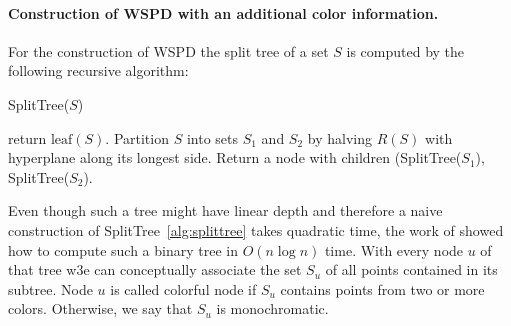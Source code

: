 \documentclass{article}
\begin{document}
\paragraph{Construction of WSPD with an additional color information.} For the construction of WSPD the split tree of a 
set $S$ is computed by the following recursive algorithm: 
\begin{algorithm}
\caption{SplitTree($S$)}\label{alg:splittree}
\begin{algorithmic}
    \State return $\textrm{leaf}(S)$.
    \Else
    \State Partition $S$ into sets $S_1$ and $S_2$ by halving $R(S)$ with hyperplane along its longest side. 
    \State Return a node with children (SplitTree($S_1$), SplitTree($S_2$).
    \EndIf
\end{algorithmic}
\end{algorithm}
Even though such a tree might have linear depth and therefore a naive construction of SplitTree~\ref{alg:splittree} takes
quadratic time, the work of \cite{callahan_95} showed how to compute such a binary tree in $O(n\log n)$ time. With every 
node $u$ of that tree w3e can conceptually associate the set $S_u$ of all points contained in its subtree. Node $u$
is called colorful node if $S_u$ contains points from two or more colors. Otherwise, we say that $S_u$ is monochromatic. 
\end{document}
